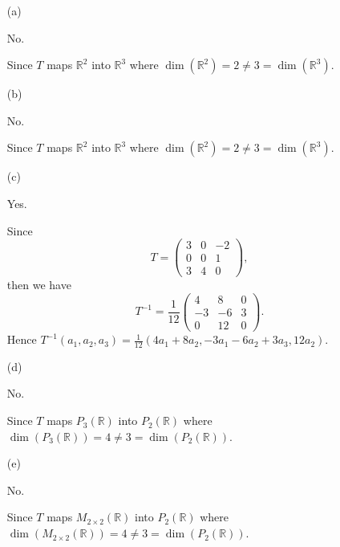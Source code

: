 \begin{Exercise}
\begin{enumerate}[(a)]
\item[(a)]
\begin{answer}
No.
\end{answer}
\begin{solution}
Since $T$ maps $\mathbb{R}^2$ into $\mathbb{R}^3$ where $\dim(\mathbb{R}^2) = 2 \neq 3 = \dim(\mathbb{R}^3)$.
\end{solution}

\item[(b)]
\begin{answer}
No.
\end{answer}
\begin{solution}
Since $T$ maps $\mathbb{R}^2$ into $\mathbb{R}^3$ where $\dim(\mathbb{R}^2) = 2 \neq 3 = \dim(\mathbb{R}^3)$.
\end{solution}

\item[(c)]
\begin{answer}
Yes.
\end{answer}
\begin{solution}
Since
$$
T = \begin{pmatrix}
3 & 0 & -2 \\
0 & 0 & 1 \\
3 & 4 & 0
\end{pmatrix},
$$
then we have
$$
T^{-1} = \frac{1}{12}\begin{pmatrix}
4 & 8 & 0 \\
-3 & -6 & 3 \\
0 & 12 & 0
\end{pmatrix}.
$$
Hence $T^{-1}(a_1,a_2,a_3) = \frac{1}{12}(4a_1+8a_2,-3a_1-6a_2+3a_3,12a_2)$.
\end{solution}

\item[(d)]
\begin{answer}
No.
\end{answer}
\begin{solution}
Since $T$ maps $P_3(\mathbb{R})$ into $P_2(\mathbb{R})$ where $\dim(P_3(\mathbb{R})) = 4 \neq 3 = \dim(P_2(\mathbb{R}))$.
\end{solution}

\item[(e)]
\begin{answer}
No.
\end{answer}
\begin{solution}
Since $T$ maps $M_{2\times 2}(\mathbb{R})$ into $P_2(\mathbb{R})$ where $\dim(M_{2\times 2}(\mathbb{R})) = 4 \neq 3 = \dim(P_2(\mathbb{R}))$.
\end{solution}


\end{enumerate}
\end{Exercise}
